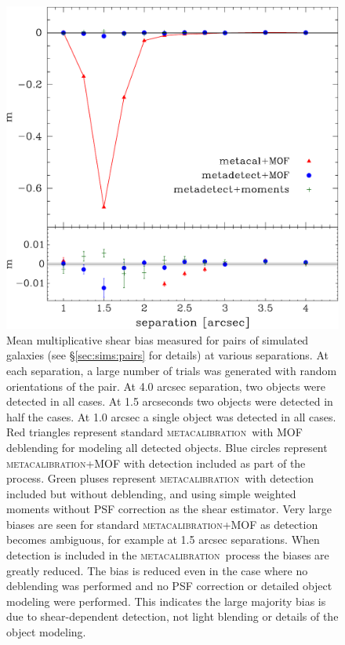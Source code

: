 \documentclass[fleqn,useAMS,usenatbib]{mnras}
\newcommand{\mcal}{\textsc{metacalibration}}
\begin{document}
\begin{figure}
    \includegraphics[width=\columnwidth]{figures/pairs-mc-bdkpair.pdf}

    \caption{Mean multiplicative shear bias measured for pairs of simulated
    galaxies (see \S \ref {sec:sims:pairs} for details) at various separations.  At
    each separation, a large number of trials was generated with random
    orientations of the pair.  At 4.0 arcsec separation, two objects were
    detected in all cases.  At 1.5 arcseconds two objects were detected in half
    the cases.  At 1.0 arcsec a single object was detected in all cases.  Red
    triangles represent standard \mcal\ with MOF deblending for modeling all
    detected objects.  Blue circles represent \mcal+MOF with detection included
    as part of the process.  Green pluses represent \mcal\ with detection
    included but without deblending, and using simple weighted moments without
    PSF correction as the shear estimator. Very large biases are seen for
    standard \mcal+MOF as detection becomes ambiguous, for example at 1.5
    arcsec separations.  When detection is included in the \mcal\ process the
    biases are greatly reduced.  The bias is reduced even in the case where no
    deblending was performed and no PSF correction or detailed object modeling
    were performed.  This indicates the large majority bias is due to
    shear-dependent detection, not light blending or details of the object
    modeling.
    \label{fig:pairbias}}

\end{figure}
\end{document}
